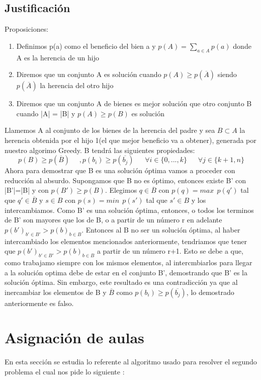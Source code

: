 \documentclass[11pt,openany]{book}
\begin{document}
\section{Justificación}
Proposiciones:
\begin{enumerate}
      \item Definimos p(a) como el beneficio del bien a y $p(A)=\sum_{a \in A} p(a) $
      donde A es la herencia de un hijo
      \item Diremos que un conjunto A es solución cuando $p(A) \geq p(\overline{A})$ 
      siendo $p(\overline{A})$ la herencia del otro hijo 
      \item Diremos que un conjunto A de bienes es mejor solución que otro conjunto B cuando
      |A| = |B| y $p(A) \geq p(B)$ es solución
\end{enumerate}
Llamemos A al conjunto de los bienes de la herencia del padre y sea $B \subset A$ la herencia obtenida por el hijo
1(el que mejor beneficio va a obtener), generada por nuestro algorimo Greedy. B tendrá las 
siguientes propiedades:
\begin{equation*}
      p(B) \geq p(\overline{B}) \ \  \ \ \ \ , p(b_i) \geq p(\overline{b_j})  \  \ \ \ \ \ \ \forall i \in \{0,...,k\} \ \ \ \ \ \ \  \forall j \in \{k+1,n\}
\end{equation*}
Ahora para demostrar que B es una solución óptima vamos a proceder con reducción al absurdo.
Supongamos que B no es óptimo, entonces existe B' con |B'|=|B| y con $p(B') \geq p(B)$.
Elegimos $q \in \overline{B}$ con $ p(q) = max\ \ p(q') $  tal que $ q' \in \overline{B} $
y $s \in B$ con $ p(s) = min\ \ p(s') $ tal que $ s' \in B $ y los intercambiamos. Como B' es
una solución óptima, entonces, o todos los terminos de B' son mayores que los de B, o a partir de un 
número r en adelante $p(b')_{b'\in B'} > p(b)_{b \in B}$. Entonces al B no ser un solución óptima, al
haber intercambiado los elementos mencionados anteriormente, tendriamos que tener que $p(b')_{b'\in B'} > p(b)_{b \in B}$
a partir de un número r+1. Esto se debe a que, como trabajamo siempre con los mismos elementos,
al intercmbiarlos para llegar a la solución optima debe de estar en el conjunto B', demostrando que
B' es la solución óptima. Sin embargo, este resultado es una contradicción ya que al inercambiar los 
elementos de B y $\overline{B}$ como $p(b_i) \geq p(\overline{b_j})$, lo demostrado anteriormente es falso.

\chapter{Asignación de aulas}
En esta sección se estudia lo referente al algoritmo usado para resolver el segundo 
problema el cual nos pide lo siguiente :
\end{document}

